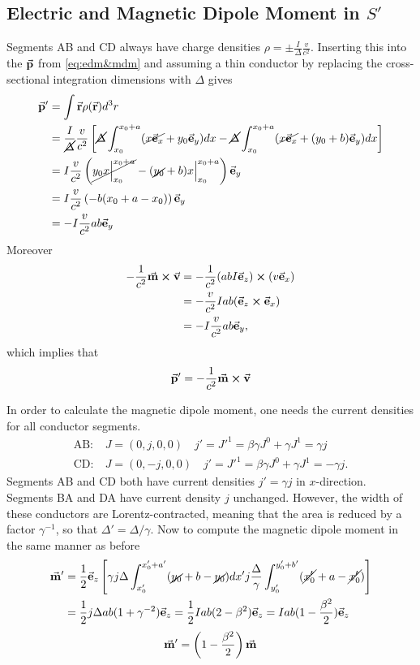 \documentclass[11pt]{amsart}
\begin{document}
\subsection{Electric and Magnetic Dipole Moment in $S'$}
Segments AB and CD always have charge densities $\rho = \pm\frac{I}{\Delta}\frac{v}{c^2}$. Inserting this into the $\va{p}$ from \ref{eq:edm&mdm} and assuming a thin conductor by replacing the cross-sectional integration dimensions with $\Delta$ gives
\begin{align*}
\va{p}'  &= \int\va{r}\rho(\va{r})d^3r \\
		&= \frac{I}{\cancel{\Delta}}\frac{v}{c^2}
		\left[
		 \cancel{\Delta}\int_{x_0}^{x_0+a}(\cancel{x\va{e}_x} + y_0\va{e}_y)dx 
		-\cancel{\Delta}\int_{x_0}^{x_0+a}(\cancel{x\va{e}_x} + (y_0 + b)\va{e}_y)dx 
		\right] \\
		&= I \frac{v}{c^2}\left(
		\cancel{y_0 x\Big|_{x_0}^{x_0 + a}}
		-(\cancel{y_0} + b)x\Big|_{x_0}^{x_0 + a}
		\right)\va{e}_y \\
		&= I \frac{v}{c^2}\left(-b(x_0 + a - x_0)\right)\va{e}_y \\
		&= -I\frac{v}{c^2}ab\va{e}_y
\end{align*}
Moreover
\begin{align*}
-\frac{1}{c^2}\va{m} \cp \va{v} &= -\frac{1}{c^2}(abI\va{e}_z) \cp (v\va{e}_x) \\
			&= -\frac{v}{c^2}Iab (\va{e}_z \cp \va{e}_x) \\
			&= -I \frac{v}{c^2}ab\va{e}_y,
\end{align*}
which implies that
\begin{equation}
\va{p}' = - \frac{1}{c^2}\va{m} \cp \va{v}
\end{equation}

In order to calculate the magnetic dipole moment, one needs the current densities for all conductor segments.
\begin{align*}
\text{AB:} &\ J = (0, j, 0, 0) \quad j' = J'^1 = \beta\gamma J^0 + \gamma J^1 = \gamma j \\
\text{CD:} &\ J = (0, -j, 0, 0) \quad j' = J'^1 = \beta\gamma J^0 + \gamma J^1 = -\gamma j.
\end{align*}
Segments AB and CD both have current densities $j' = \gamma j$ in $x$-direction. Segments BA and DA have current density $j$ unchanged. However, the width of these conductors are Lorentz-contracted, meaning that the area is reduced by a factor $\gamma^{-1}$, so that $\Delta' = \Delta / \gamma$. Now to compute the magnetic dipole moment in the same manner as before
\begin{align*}
\va{m}' &= \frac{1}{2}\va{e}_z\left[
	\gamma j \Delta \int_{x_0'}^{x_0' + a'} (\cancel{y_0} + b - \cancel{y_0})dx' 
	j \frac{\Delta}{\gamma} \int_{y_0'}^{y_0' + b'} (\cancel{x_0'} + a - \cancel{x_0'})
	\right] \\
	&= \frac{1}{2} j \Delta ab (1 + \gamma^{-2})\va{e}_z = \frac{1}{2} I ab (2 - \beta^2)\va{e}_z = I ab (1 - \frac{\beta^2}{2})\va{e}_z
\end{align*}
\begin{equation}
\va{m}' = \left(1 - \frac{\beta^2}{2} \right)\va{m}
\end{equation}
\end{document}
